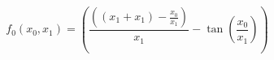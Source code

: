 \documentclass{article}
\begin{document}
\begin{equation}
f_0(x_0,x_1)=\left(\frac{\left(\left(x_1 + x_1\right) - \frac{x_0}{x_1}\right)}{x_1} -  \tan(\frac{x_0}{x_1} )\right)
\end{equation}
\end{document}
